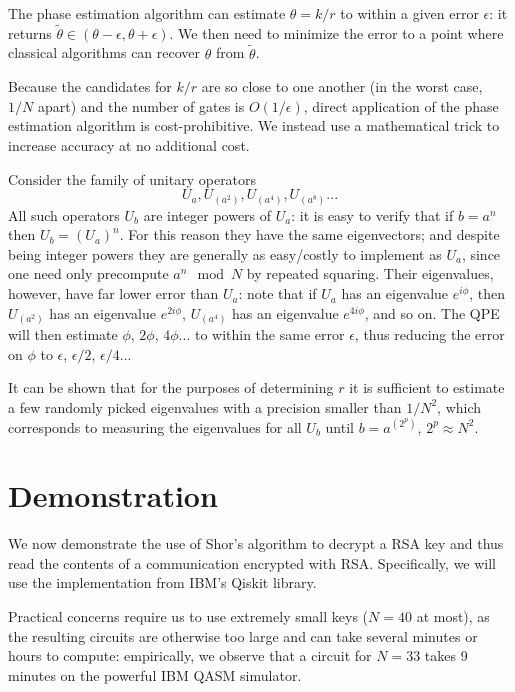 \documentclass[conference]{IEEEtran}
\begin{document}
The phase estimation algorithm can estimate $\theta=k/r$ to within a given error $\epsilon$: it returns $\widetilde\theta \in (\theta-\epsilon, \theta+\epsilon)$. We then need to minimize the error to a point where classical algorithms can recover $\theta$ from $\widetilde\theta$.

Because the candidates for $k/r$ are so close to one another (in the worst case, $1/N$ apart) and the number of gates is $O(1/\epsilon)$, direct application of the phase estimation algorithm is cost-prohibitive. We instead use a mathematical trick to increase accuracy at no additional cost.

Consider the family of unitary operators
\begin{equation}
U_a, U_{(a^2)}, U_{(a^4)}, U_{(a^8)}...
\end{equation}
All such operators $U_b$ are integer powers of $U_a$: it is easy to verify that if $b = a^n$ then $U_b = (U_a)^n$. For this reason they have the same eigenvectors; and despite being integer powers they are generally as easy/costly to implement as $U_a$, since one need only precompute $a^n \mod N$ by repeated squaring. Their eigenvalues, however, have far lower error than $U_a$: note that if $U_a$ has an eigenvalue $e^{i\phi}$, then $U_{(a^2)}$ has an eigenvalue $e^{2i\phi}$, $U_{(a^4)}$ has an eigenvalue $e^{4i\phi}$, and so on. The QPE will then estimate $\phi$, $2\phi$, $4\phi$... to within the same error $\epsilon$, thus reducing the error on $\phi$ to $\epsilon$, $\epsilon/2$, $\epsilon/4$...

It can be shown that for the purposes of determining $r$ it is sufficient to estimate a few randomly picked eigenvalues with a precision smaller than $1/N^2$, which corresponds to measuring the eigenvalues for all $U_b$ until $b=a^{(2^p)}$, $2^p \approx N^2$.

\section{Demonstration}
We now demonstrate the use of Shor's algorithm to decrypt a RSA key and thus read the contents of a communication encrypted with RSA. Specifically, we will use the implementation from IBM's Qiskit library.

Practical concerns require us to use extremely small keys ($N=40$ at most), as the resulting circuits are otherwise too large and can take several minutes or hours to compute: empirically, we observe that a circuit for $N=33$ takes 9 minutes on the powerful IBM QASM simulator.
\end{document}

